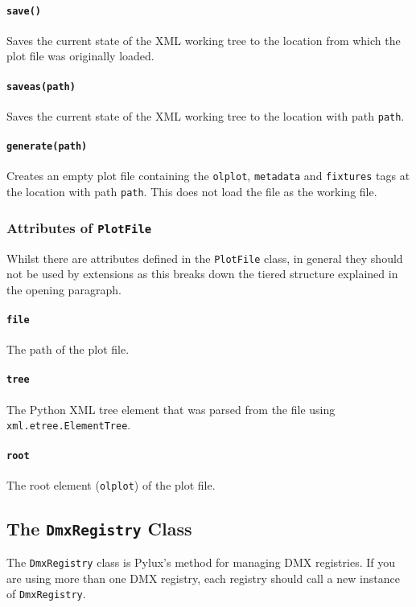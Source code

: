 \documentclass[a4paper]{article}
\begin{document}
\paragraph{\texttt{save()}}
Saves the current state of the XML working tree to the location from which 
the plot file was originally loaded.

\paragraph{\texttt{saveas(path)}}
Saves the current state of the XML working tree to the location with path 
\texttt{path}.

\paragraph{\texttt{generate(path)}}
Creates an empty plot file containing the \texttt{olplot}, \texttt{metadata} 
and \texttt{fixtures} tags at the location with path \texttt{path}. This does 
not load the file as the working file.

\subsubsection{Attributes of \texttt{PlotFile}}
Whilst there are attributes defined in the \texttt{PlotFile} class, in 
general they should not be used by extensions as this breaks down the 
tiered structure explained in the opening paragraph.

\paragraph{\texttt{file}}
The path of the plot file.

\paragraph{\texttt{tree}}
The Python XML tree element that was parsed from the file using 
\texttt{xml.etree.ElementTree}.

\paragraph{\texttt{root}}
The root element (\texttt{olplot}) of the plot file.

\subsection{The \texttt{DmxRegistry} Class}
The \texttt{DmxRegistry} class is Pylux's method for managing DMX registries. 
If you are using more than one DMX registry, each registry should call a new 
instance of \texttt{DmxRegistry}.
\end{document}
